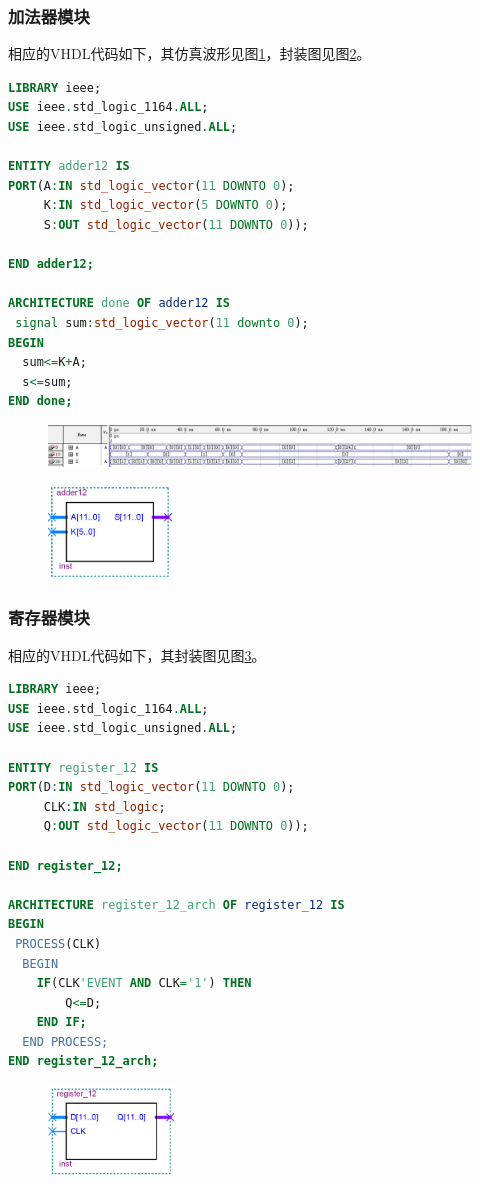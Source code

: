 \documentclass[12pt]{article}
\begin{document}
\subsubsection{加法器模块}
相应的VHDL代码如下，其仿真波形见图\ref{fig:fangzhenadd}，封装图见图\ref{fig:fengzhuangadd}。
\begin{lstlisting}[language=VHDL]
LIBRARY ieee;
USE ieee.std_logic_1164.ALL;
USE ieee.std_logic_unsigned.ALL;

ENTITY adder12 IS 
PORT(A:IN std_logic_vector(11 DOWNTO 0);
     K:IN std_logic_vector(5 DOWNTO 0);
     S:OUT std_logic_vector(11 DOWNTO 0));

END adder12;
    
ARCHITECTURE done OF adder12 IS
 signal sum:std_logic_vector(11 downto 0);
BEGIN
  sum<=K+A;
  s<=sum;
END done;
\end{lstlisting}
\begin{figure}[hp]
	\centering  
	\includegraphics[width=\textwidth]{picture/TIM20181212152917.png} 
	\caption{}
	\label{fig:fangzhenadd}   
\end{figure}
\begin{figure}[hp]
	\centering  
	\includegraphics[width=0.3\textwidth]{picture/add.png} 
	\caption{}
	\label{fig:fengzhuangadd}   
\end{figure}
\subsubsection{寄存器模块}
相应的VHDL代码如下，其封装图见图\ref{fig:fengzhuangreg}。
\begin{lstlisting}[language=VHDL]
LIBRARY ieee;
USE ieee.std_logic_1164.ALL;
USE ieee.std_logic_unsigned.ALL;

ENTITY register_12 IS 
PORT(D:IN std_logic_vector(11 DOWNTO 0);
     CLK:IN std_logic;
     Q:OUT std_logic_vector(11 DOWNTO 0));

END register_12;

ARCHITECTURE register_12_arch OF register_12 IS
BEGIN
 PROCESS(CLK)
  BEGIN
    IF(CLK'EVENT AND CLK='1') THEN
        Q<=D;
    END IF;
  END PROCESS;
END register_12_arch;
\end{lstlisting}
\begin{figure}[hp]
	\centering  
	\includegraphics[width=0.3\textwidth]{picture/reg.png} 
	\caption{}
	\label{fig:fengzhuangreg}   
\end{figure}
\end{document}

